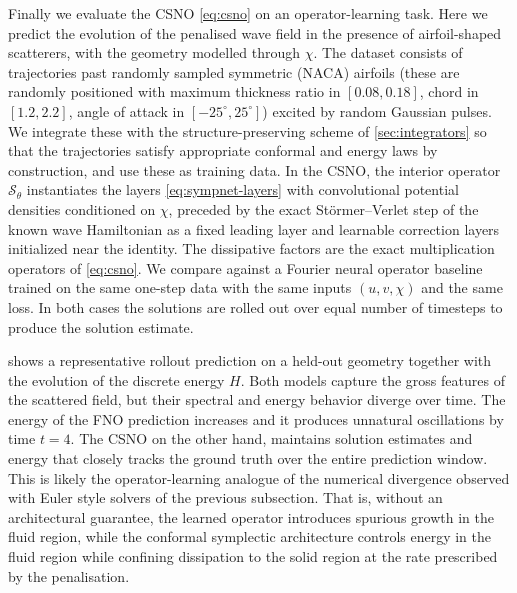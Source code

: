 \documentclass[11pt]{article}
\theoremstyle{definition}
\theoremstyle{remark}
\newcommand{\So}{\mathcal{S}}
\begin{document}
Finally we evaluate the CSNO \eqref{eq:csno} on an operator-learning
task. Here we predict the evolution of the penalised wave field in the
presence of airfoil-shaped scatterers, with the geometry modelled
through $\chi$.  The dataset consists of trajectories past randomly
sampled symmetric (NACA) airfoils (these are randomly positioned with maximum thickness ratio in $[0.08,0.18]$, chord in $[1.2,2.2]$, angle of attack in $[-25^\circ,25^\circ]$) excited by random Gaussian
pulses. We integrate these with the structure-preserving scheme of
\cref{sec:integrators} so that the trajectories satisfy appropriate conformal and energy laws by construction, and use these as training data.  In the CSNO, the interior
operator $\So_\theta$ instantiates the layers
\eqref{eq:sympnet-layers} with convolutional potential densities
conditioned on $\chi$, preceded by the exact St\"ormer--Verlet step
of the known wave Hamiltonian as a fixed leading layer
and learnable correction layers initialized near the identity. The
dissipative factors are the exact multiplication operators of
\eqref{eq:csno}.  We compare against a Fourier neural operator
baseline \cite{li2021fourier} trained on the same one-step data with
the same inputs $(u,v,\chi)$ and the same loss. In both cases the solutions are rolled out over equal number of timesteps to produce the solution estimate.

 shows a representative rollout prediction on a
held-out geometry together with the evolution of the discrete energy
$H$.  Both models capture the gross features of the scattered field,
but their spectral and energy behavior diverge over time. The energy of the FNO prediction increases and it produces unnatural oscillations by time $t=4$. The CSNO on the other hand, maintains solution estimates and energy that closely tracks the ground truth over the entire prediction window. This is likely the operator-learning analogue of the numerical divergence observed with Euler style solvers of the previous subsection. That is, without an architectural guarantee, the learned operator introduces spurious growth in the fluid region, while the conformal symplectic architecture controls energy in the fluid region while confining dissipation to the solid region at the rate prescribed by the penalisation.
\end{document}
